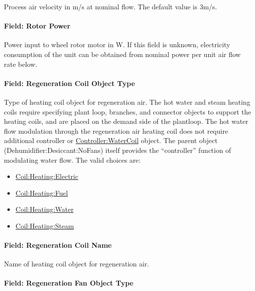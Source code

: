 Process air velocity in m/s at nominal flow. The default value is 3m/s.

\paragraph{Field: Rotor Power}\label{field-rotor-power}

Power input to wheel rotor motor in W. If this field is unknown, electricity consumption of the unit can be obtained from nominal power per unit air flow rate below.

\paragraph{Field: Regeneration Coil Object Type}\label{field-regeneration-coil-object-type}

Type of heating coil object for regeneration air. The hot water and steam heating coils require specifying plant loop, branches, and connector objects to support the heating coils, and are placed on the demand side of the plantloop. The hot water flow modulation through the regeneration air heating coil does not require additional controller or \hyperref[controllerwatercoil]{Controller:WaterCoil} object. The parent object (Dehumidifier:Desiccant:NoFans) itself provides the ``controller'' function of modulating water flow. The valid choices are:

\begin{itemize}
\item
  \hyperref[coilheatingelectric]{Coil:Heating:Electric}
\item
  \hyperref[coilheatinggas-000]{Coil:Heating:Fuel}
\item
  \hyperref[coilheatingwater]{Coil:Heating:Water}
\item
  \hyperref[coilheatingsteam]{Coil:Heating:Steam}
\end{itemize}

\paragraph{Field: Regeneration Coil Name}\label{field-regeneration-coil-name}

Name of heating coil object for regeneration air.

\paragraph{Field: Regeneration Fan Object Type}\label{field-regeneration-fan-object-type}

